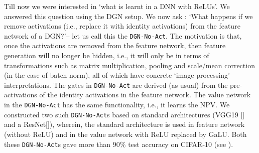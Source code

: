 Till now we were interested in `what is learnt in a DNN with ReLUs'. We answered this question using the DGN setup.  We now ask : `What happens if we remove activations (i.e., replace it with identity activations) from the feature network of a DGN?'-- let us call this the \texttt{DGN-No-Act}. The motivation is that, once the activations are removed from the feature network, then feature generation will no longer be hidden, i.e., it will only be in terms of transformations such as matrix multiplication, pooling and scale/mean correction (in the case of batch norm), all of which have concrete `image processing'  interpretations. The gates in \texttt{DGN-No-Act} are derived (as usual) from the pre-activations of the identity activations in the feature network. The value network in the \texttt{DGN-No-Act} has the same functionality, i.e., it learns the NPV. We constructed two such \texttt{DGN-No-Act}s based on standard architectures (VGG19 [] and a ResNet[]), wherein, the standard architecture is used in feature network (without ReLU) and in the value network with ReLU replaced by GaLU. Both these \texttt{DGN-No-Act}s gave more than $90\%$ test accuracy on CIFAR-10 (see ).

